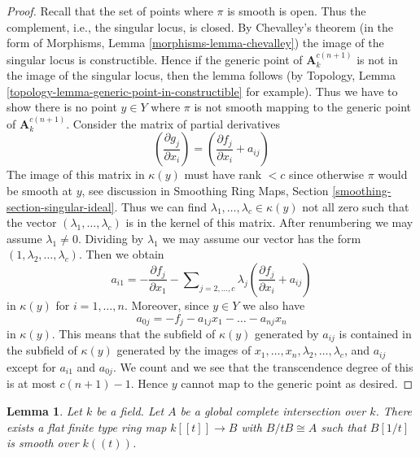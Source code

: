 \documentclass{stacks-project}
\theoremstyle{plain}
\newtheorem{lemma}[subsection]{Lemma}
\theoremstyle{definition}
\theoremstyle{remark}
\numberwithin{equation}{subsection}
\begin{document}
\begin{proof}
Recall that the set of points where $\pi$ is smooth is open.
Thus the complement, i.e., the singular locus, is closed.
By Chevalley's theorem (in the form of
Morphisms, Lemma \ref{morphisms-lemma-chevalley})
the image of the singular locus is constructible.
Hence if the generic point of $\mathbf{A}^{c(n + 1)}_k$
is not in the image of the singular locus, then
the lemma follows (by Topology, Lemma
\ref{topology-lemma-generic-point-in-constructible} for example).
Thus we have to show there is no point
$y \in Y$ where $\pi$ is not smooth mapping to
the generic point of $\mathbf{A}^{c(n + 1)}_k$.
Consider the matrix of partial derivatives
$$
(\frac{\partial g_j}{\partial x_i}) =
(\frac{\partial f_j}{\partial x_i} + a_{ij})
$$
The image of this matrix in $\kappa(y)$ must have rank $< c$
since otherwise $\pi$ would be smooth at $y$, see discussion in
Smoothing Ring Maps, Section \ref{smoothing-section-singular-ideal}.
Thus we can find $\lambda_1, \ldots, \lambda_c \in \kappa(y)$
not all zero such that the vector $(\lambda_1, \ldots, \lambda_c)$
is in the kernel of this matrix.
After renumbering we may assume $\lambda_1 \not = 0$.
Dividing by $\lambda_1$ we may assume our vector has
the form $(1, \lambda_2, \ldots, \lambda_c)$.
Then we obtain
$$
a_{i1} = -
\frac{\partial f_j}{\partial x_1} -
\sum\nolimits_{j = 2, \ldots, c} \lambda_j(\frac{\partial f_j}{\partial x_i} + a_{ij})
$$
in $\kappa(y)$ for $i = 1, \ldots, n$. Moreover, since $y \in Y$ we also
have
$$
a_{0j} = -f_j - a_{1j}x_1 - \ldots - a_{nj}x_n
$$
in $\kappa(y)$. This means that the subfield of $\kappa(y)$
generated by $a_{ij}$ is contained in the subfield of $\kappa(y)$
generated by the images of $x_1, \ldots, x_n, \lambda_2, \ldots, \lambda_c$,
and $a_{ij}$ except for $a_{i1}$ and $a_{0j}$.
We count and we see that the transcendence degree of this is
at most $c(n + 1) - 1$. Hence $y$ cannot map to the generic point
as desired.
\end{proof}

\begin{lemma}
\label{lemma-smoothing-affine-lci}
Let $k$ be a field. Let $A$ be a global complete intersection
over $k$. There exists a flat finite type ring map
$k[[t]] \to B$ with $B/tB \cong A$ such that
$B[1/t]$ is smooth over $k((t))$.
\end{lemma}
\end{document}
